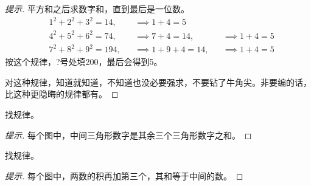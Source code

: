 \begin{proof}[提示]平方和之后求数字和，直到最后是一位数。
  \begin{align*}
    &1^2+2^2+3^2 = 14, && \implies 1 + 4 = 5\\
    &4^2+5^2+6^2 = 74, && \implies 7 + 4 = 14, && \implies 1+4=5\\
    &7^2+8^2+9^2 = 194,&& \implies 1+9+4=14, && \implies 1+4=5
  \end{align*}
  按这个规律，?号处填200，最后会得到5。

  \note 对这种规律，知道就知道，不知道也没必要强求，不要钻了牛角尖。非要编的话，比这种更隐晦的规律都有。
\end{proof}


\begin{example}找规律。
  \begin{center}
  \end{center}
\end{example}
\begin{proof}[提示]
  每个图中，中间三角形数字是其余三个三角形数字之和。
\end{proof}

\begin{example}找规律。
  \begin{center}
  \end{center}
\end{example}
\begin{proof}[提示]
  每个图中，两数的积再加第三个，其和等于中间的数。
\end{proof}

